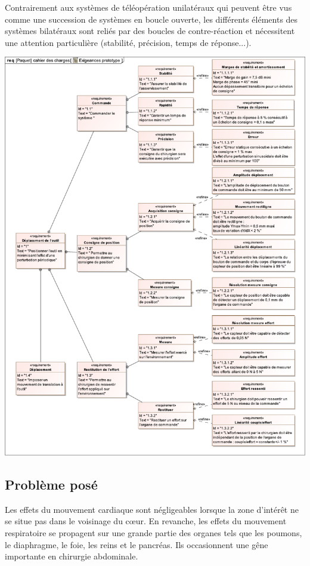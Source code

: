 Contrairement aux systèmes de téléopération unilatéraux qui peuvent être vus comme une succession de systèmes en boucle ouverte, les différents éléments des systèmes bilatéraux sont reliés par des boucles de contre-réaction et nécessitent une attention particulière (stabilité, précision, temps de réponse...).

\begin{center}
 \includegraphics[width=0.9\linewidth]{img/Figure2}
\end{center}

\subsection{Problème posé}

Les effets du mouvement cardiaque sont négligeables lorsque la zone d'intérêt ne se situe pas dans le voisinage du c\oe ur. En revanche, les effets du mouvement respiratoire se propagent sur une grande partie des organes tels que les poumons, le diaphragme, le foie, les reins et le pancréas. Ils occasionnent une gêne importante en chirurgie abdominale.

